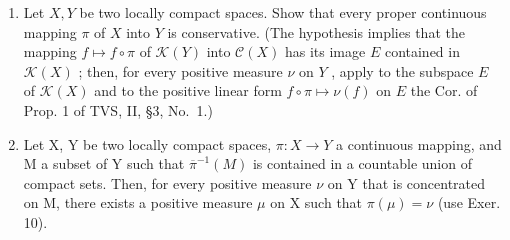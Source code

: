 \begin{enumerate}
\def\labelenumi{\arabic{enumi})}
\setcounter{enumi}{9}
\item
  Let \(X, Y\) be two locally compact spaces. Show that every proper continuous mapping \(\pi\) of \(X\) into \(Y\) is conservative. (The hypothesis implies that the mapping \(f \mapsto f \circ \pi\) of \(\mathcal{K}(Y)\) into \(\mathcal{C}(X)\) has its image \(E\) contained in \(\mathcal{K}(X)\) ; then, for every positive measure \(\nu\) on \(Y\) , apply to the subspace \(E\) of \(\mathcal{K}(X)\) and to the positive linear form \(f \circ \pi \mapsto \nu(f)\) on \(E\) the Cor. of Prop. 1 of TVS, II, §3, No.~1.)
\item
  Let X, Y be two locally compact spaces, \(\pi: X \to Y\) a continuous mapping, and M a subset of Y such that \(\overline{\pi}^{-1}(M)\) is contained in a countable union of compact sets. Then, for every positive measure \(\nu\) on Y that is concentrated on M, there exists a positive measure \(\mu\) on X such that \(\pi(\mu) = \nu\) (use Exer. 10).
\end{enumerate}
\relax{}
\setcounter{exercisegroup}{8}
\edef\CurrentExerciseGroup{\arabic{exercisegroup}}
